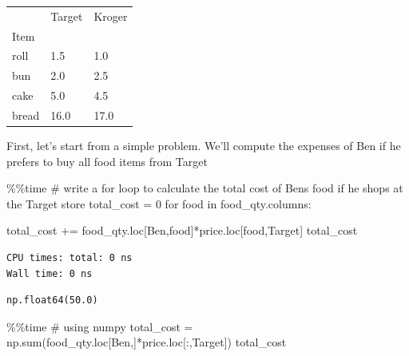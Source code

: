 \documentclass[
  letterpaper,
  DIV=11,
  numbers=noendperiod]{scrreprt}
\newenvironment{Shaded}{\begin{snugshade}}{\end{snugshade}}
\newcommand{\BuiltInTok}[1]{\textcolor[rgb]{0.00,0.23,0.31}{#1}}
\newcommand{\CommentTok}[1]{\textcolor[rgb]{0.37,0.37,0.37}{#1}}
\newcommand{\ControlFlowTok}[1]{\textcolor[rgb]{0.00,0.23,0.31}{#1}}
\newcommand{\DecValTok}[1]{\textcolor[rgb]{0.68,0.00,0.00}{#1}}
\newcommand{\KeywordTok}[1]{\textcolor[rgb]{0.00,0.23,0.31}{#1}}
\newcommand{\NormalTok}[1]{\textcolor[rgb]{0.00,0.23,0.31}{#1}}
\newcommand{\OperatorTok}[1]{\textcolor[rgb]{0.37,0.37,0.37}{#1}}
\newcommand{\StringTok}[1]{\textcolor[rgb]{0.13,0.47,0.30}{#1}}
\begin{document}
\begin{longtable}[]{@{}lll@{}}
\toprule\noalign{}
& Target & Kroger \\
Item & & \\
\midrule\noalign{}
\endhead
\bottomrule\noalign{}
\endlastfoot
roll & 1.5 & 1.0 \\
bun & 2.0 & 2.5 \\
cake & 5.0 & 4.5 \\
bread & 16.0 & 17.0 \\
\end{longtable}

First, let's start from a simple problem. We'll compute the expenses of
Ben if he prefers to buy all food items from Target

\begin{Shaded}
\begin{Highlighting}[]
\OperatorTok{\%\%}\NormalTok{time}
\CommentTok{\# write a for loop to calculate the total cost of Ben\textquotesingle{}s food if he shops at the Target store}
\NormalTok{total\_cost }\OperatorTok{=} \DecValTok{0} 
\ControlFlowTok{for}\NormalTok{ food }\KeywordTok{in}\NormalTok{ food\_qty.columns:}

\NormalTok{    total\_cost }\OperatorTok{+=}\NormalTok{ food\_qty.loc[}\StringTok{\textquotesingle{}Ben\textquotesingle{}}\NormalTok{,food]}\OperatorTok{*}\NormalTok{price.loc[food,}\StringTok{\textquotesingle{}Target\textquotesingle{}}\NormalTok{]}
\NormalTok{total\_cost}
\end{Highlighting}
\end{Shaded}

\begin{verbatim}
CPU times: total: 0 ns
Wall time: 0 ns
\end{verbatim}

\begin{verbatim}
np.float64(50.0)
\end{verbatim}

\begin{Shaded}
\begin{Highlighting}[]
\OperatorTok{\%\%}\NormalTok{time}
\CommentTok{\# using numpy }
\NormalTok{total\_cost }\OperatorTok{=}\NormalTok{ np.}\BuiltInTok{sum}\NormalTok{(food\_qty.loc[}\StringTok{\textquotesingle{}Ben\textquotesingle{}}\NormalTok{,]}\OperatorTok{*}\NormalTok{price.loc[:,}\StringTok{\textquotesingle{}Target\textquotesingle{}}\NormalTok{])}
\NormalTok{total\_cost}
\end{Highlighting}
\end{Shaded}
\end{document}
